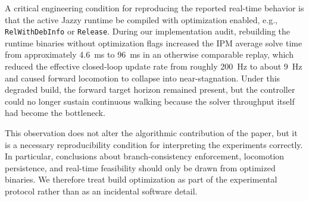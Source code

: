 A critical engineering condition for reproducing the reported real-time behavior is that the active Jazzy runtime be compiled with optimization enabled, e.g., \texttt{RelWithDebInfo} or \texttt{Release}. During our implementation audit, rebuilding the runtime binaries without optimization flags increased the IPM average solve time from approximately 4.6~ms to 96~ms in an otherwise comparable replay, which reduced the effective closed-loop update rate from roughly 200~Hz to about 9~Hz and caused forward locomotion to collapse into near-stagnation. Under this degraded build, the forward target horizon remained present, but the controller could no longer sustain continuous walking because the solver throughput itself had become the bottleneck.

This observation does not alter the algorithmic contribution of the paper, but it is a necessary reproducibility condition for interpreting the experiments correctly. In particular, conclusions about branch-consistency enforcement, locomotion persistence, and real-time feasibility should only be drawn from optimized binaries. We therefore treat build optimization as part of the experimental protocol rather than as an incidental software detail.
